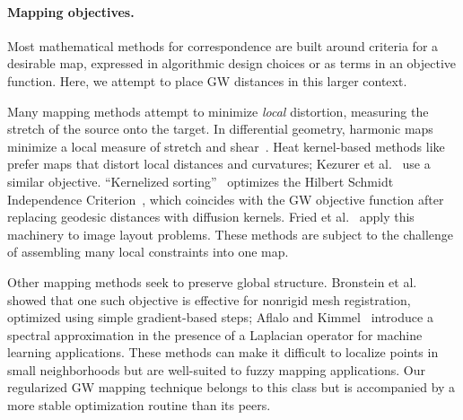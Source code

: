 

\paragraph*{Mapping objectives.} Most mathematical methods for correspondence are built around criteria for a desirable map, expressed in algorithmic design choices or as terms in an objective function.  Here, we attempt to place GW distances in this larger context.


Many mapping methods attempt to minimize \emph{local} distortion, measuring the stretch of the source onto the target.  In differential geometry, harmonic maps minimize a local measure of stretch and shear~\cite{urakawa-2013}.  Heat kernel-based methods like~\cite{ovsjanikov-2010} prefer maps that distort local distances and curvatures; Kezurer et al.~ use a similar objective.  ``Kernelized sorting''~\cite{quadrianto-2009} optimizes the Hilbert Schmidt Independence Criterion~\cite{smola-2007}, which coincides with the GW objective function after replacing geodesic distances with diffusion kernels. Fried et al.~ apply this machinery to image layout problems.  These methods are subject to the challenge of assembling many local constraints into one map.

Other mapping methods seek to preserve global structure.  Bronstein et al.~ showed that one such objective is effective for nonrigid mesh registration, optimized using simple gradient-based steps; Aflalo and Kimmel~ introduce a spectral approximation in the presence of a Laplacian operator for machine learning applications.  These methods can make it difficult to localize points in small neighborhoods but are well-suited to fuzzy mapping applications.  Our regularized GW mapping technique belongs to this class but is accompanied by a more stable optimization routine than its peers.

